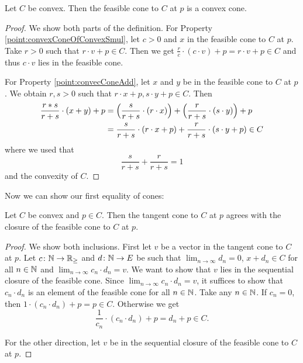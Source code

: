\begin{lem}
Let $C$ be convex. Then the feasible cone to $C$ at $p$ is a convex cone. 
\end{lem}
\begin{proof}
We show both parts of the definition. 
For Property \ref{point:convexConeOfConvexSmul}, let $c > 0$ and $x$ in the feasible cone to $C$ at $p$.
Take $r > 0$ such that $r \cdot v + p \in C$. 
Then we get $\tfrac{r}{c} \cdot (c \cdot v) + p = r \cdot v + p \in C$ and thus $c \cdot v$ lies in the feasible cone. 

For Property \ref{point:convecConeAdd}, let $x$ and $y$ be in the feasible cone to $C$ at $p$. 
We obtain $r, s > 0$ such that $r \cdot x + p, s \cdot y + p \in C$. 
Then 
\begin{equation*}
\begin{split}
\frac{r * s}{r + s} \cdot (x + y) + p &= \Bigl(\frac{s}{r + s} \cdot (r \cdot x)\Bigr) + \Bigl(\frac{r}{r + s} \cdot (s \cdot y)\Bigr) + p \\
&= \frac{s}{r + s} \cdot (r \cdot x + p) + \frac{r}{r + s} \cdot (s \cdot y + p) \in C \\
\end{split}
\end{equation*}
where we used that 
\begin{equation*}
\frac{s}{r + s} + \frac{r}{r + s} = 1
\end{equation*}
and the convexity of $C$.
\end{proof}

Now we can show our first equality of cones: 

\begin{lem}
Let $C$ be convex and $p \in C$. Then the tangent cone to $C$ at $p$ agrees with the closure of the feasible cone to $C$ at $p$. 
\end{lem}

\begin{proof}
We show both inclusions.
First let $v$ be a vector in the tangent cone to $C$ at $p$.
Let $c \colon \mathbb{N} \to \mathbb{R}_\ge$ and $d \colon \mathbb{N} \to E$ be such that $\lim_{n \to \infty} d_n = 0$, $x + d_n \in C$ for all $n \in \mathbb{N}$ and $\lim_{n \to \infty} c_n \cdot d_n = v$. 
We want to show that $v$ lies in the sequential closure of the feasible cone. 
Since $\lim_{n \to \infty} c_n \cdot d_n = v$, it suffices to show that $c_n \cdot d_n$ is an element of the feasible cone for all $n \in \mathbb{N}$.
Take any $n \in \mathbb{N}$. If $c_n = 0$, then $1 \cdot (c_n \cdot d_n) + p = p \in C$. 
Otherwise we get 
\begin{equation*}
\frac{1}{c_n} \cdot (c_n \cdot d_n) + p = d_n + p \in C.
\end{equation*}

For the other direction, let $v$ be in the sequential closure of the feasible cone to $C$ at $p$. 


\end{proof}


